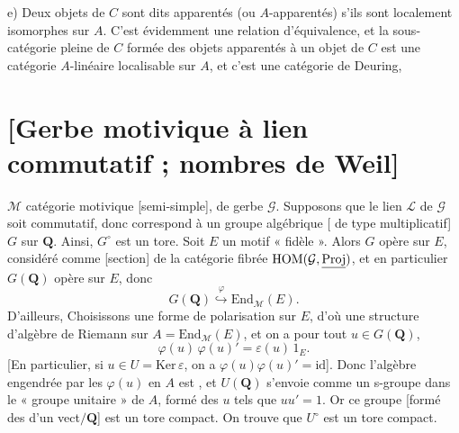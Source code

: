 \documentclass[11pt,a4paper]{article}
\begin{document}
e) Deux objets de $C$ sont dits apparentés (ou $A$-apparentés) s'ils sont
localement isomorphes sur $A$. C'est évidemment une relation d'équivalence,
et la sous-catégorie pleine de $C$ formée des objets apparentés à un objet
de $C$ est une catégorie  $A$-linéaire localisable sur $A$, et
c'est une catégorie de Deuring,

\section{[Gerbe motivique à lien commutatif ; nombres de Weil]}



$\mathcal{M}$ catégorie motivique [semi-simple], de gerbe $\mathcal{G}$.
Supposons que le lien $\mathcal{L}$ de $\mathcal{G}$ soit
\struck{\ill{}} commutatif, donc correspond à un groupe algébrique
[ de type multiplicatif] $G$ sur $\mathbf{Q}$. Ainsi,
$G^{\circ}$ est un tore. Soit $E$ un motif « fidèle ».  Alors $G$ opère sur $E$, considéré comme  [section] de
la catégorie fibrée $\mathrm{HOM}(\mathcal{G}, \uncertain{\mathrm{Proj}})$,
et en particulier $G(\mathbf{Q})$ opère sur $E$, donc
\[
  G(\mathbf{Q}) \overset{\varphi}{\hookrightarrow} \mathrm{End}_{\mathcal{M}}(E).
\]
D'ailleurs, 
Choisissons une forme de polarisation sur $E$, d'où une structure
d'algèbre de Riemann sur $A = \mathrm{End}_{\mathcal{M}}(E)$, et on a
\ill{} pour tout $u \in G(\mathbf{Q})$,
\[
  \varphi(u)\,\varphi(u)' = \varepsilon(u)\,1_{E} .
\]
[En particulier, si $u \in U = \mathrm{Ker}\,\varepsilon$, on a
$\varphi(u)\varphi(u)' = \mathrm{id}$]. Donc l'algèbre engendrée par les
$\varphi(u)$ en $A$ est , et $U(\mathbf{Q})$
s'envoie comme un s-groupe dans le « groupe unitaire » de $A$, formé des
$u$ tels que $uu' = 1$.  Or ce groupe [formé des
\ill{} d'un \ill{} vect$/\mathbf{Q}$] est un tore compact. On trouve que
$U^{\circ}$ est un tore compact.
\end{document}
